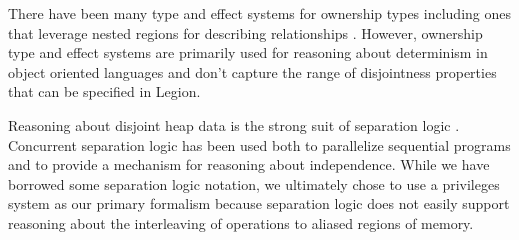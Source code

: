 
There have been many type and effect systems for ownership types
\cite{Boyapati03} including ones that leverage nested regions for describing
relationships \cite{Clarke02,Cameron07}.  However, ownership type and effect systems
are primarily used for reasoning about determinism in object oriented languages and
don't capture the range of disjointness properties that can be specified in Legion.

Reasoning about disjoint heap data is the strong suit of separation logic \cite{Reynolds02}.  
Concurrent separation logic\cite{Brookes04} has been 
used both to parallelize sequential programs\cite{Raza09,Gotsman07} and to provide 
a mechanism for reasoning about independence\cite{Hayman06}.
While we have borrowed some separation logic notation, we ultimately chose to use a 
privileges system as our primary formalism because separation logic does not easily
support reasoning about the interleaving of operations to aliased regions of memory.





